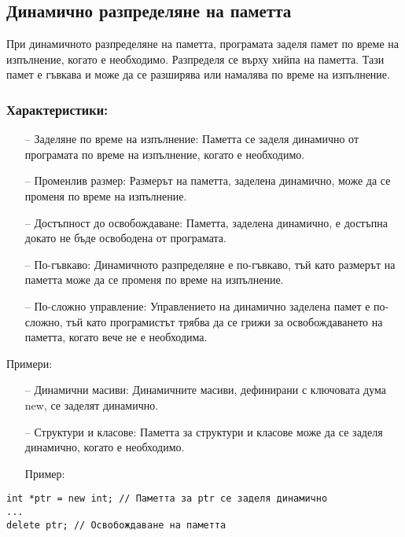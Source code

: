 \documentclass[oneside]{book}
\begin{document}
\subsection{Динамично разпределяне на паметта}
При динамичното разпределяне на паметта, програмата заделя памет по време на изпълнение, когато е необходимо. Разпределя се върху хийпа на паметта. Тази памет е гъвкава и може да се разширява или намалява по време на изпълнение.

\subsubsection{Характеристики:}

\begin{itemize}
    \item[--] Заделяне по време на изпълнение: Паметта се заделя динамично от програмата по време на изпълнение, когато е необходимо.
    \item[--] Променлив размер: Размерът на паметта, заделена динамично, може да се променя по време на изпълнение.
    \item[--] Достъпност до освобождаване: Паметта, заделена динамично, е достъпна докато не бъде освободена от програмата.
    \item[--] По-гъвкаво: Динамичното разпределяне е по-гъвкаво, тъй като размерът на паметта може да се променя по време на изпълнение.
    \item[--] По-сложно управление: Управлението на динамично заделена памет е по-сложно, тъй като програмистът трябва да се грижи за освобождаването на паметта, когато вече не е необходима.
\end{itemize}
\pagebreak
Примери:
\begin{itemize}
    \item[--] Динамични масиви: Динамичните масиви, дефинирани с ключовата дума new, се заделят динамично.
    \item[--] Структури и класове: Паметта за структури и класове може да се заделя динамично, когато е необходимо.
\end{itemize}

\begin{itemize}\item[Пример:]\end{itemize}
\begin{mdframed}\begin{lstlisting}
int *ptr = new int; // Паметта за ptr се заделя динамично
...
delete ptr; // Освобождаване на паметта
\end{lstlisting}\end{mdframed}
\end{document}
